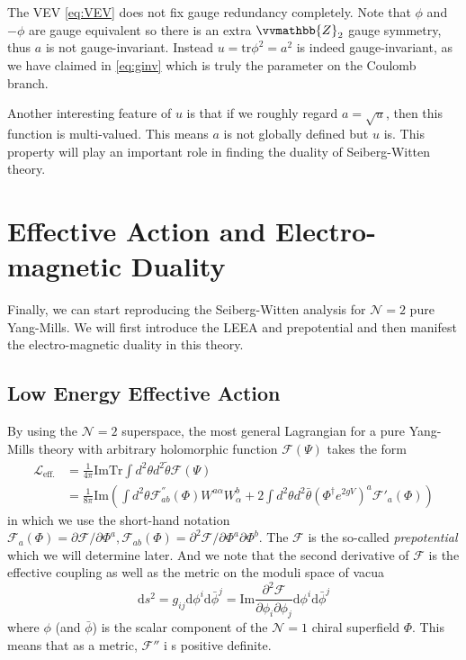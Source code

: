 \documentclass{article}
\begin{document}
The VEV \eqref{eq:VEV} does not fix gauge redundancy completely. Note that $\phi$ and $-\phi$ are gauge equivalent so there is an extra $\vvmathbb{Z}_2$ gauge symmetry, thus $a$ is not gauge-invariant. Instead $u=\mathrm{tr}\phi^2=a^2$ is indeed gauge-invariant, as we have claimed in \eqref{eq:ginv} which is truly the parameter on the Coulomb branch. 

Another interesting feature of $u$ is that if we roughly regard $a=\sqrt{u}$, then this function is multi-valued. This means $a$ is not globally defined but $u$ is. This property will play an important role in finding the duality of Seiberg-Witten theory.

\section{Effective Action and Electro-magnetic Duality}
Finally, we can start reproducing the Seiberg-Witten analysis for $\mathcal{N}=2$ pure Yang-Mills. We will first introduce the LEEA and prepotential and then manifest the electro-magnetic duality in this theory.
\subsection{Low Energy Effective Action}
By using the $\mathcal{N}=2$ superspace, the most general Lagrangian for a pure Yang-Mills theory with arbitrary holomorphic function $\mathscr{F}(\Psi)$ takes the form
\begin{equation}
\begin{aligned}
\label{eq:efflag}
\mathscr{L}_{\mathrm{eff.}} &=\frac{1}{4 \pi} \mathrm{Im} \mathrm{Tr} \int d^{2} \theta d^{2} \tilde{\theta} \mathscr{F}(\Psi) \\
&=\frac{1}{8 \pi} \mathrm{Im}\left(\int d^{2} \theta \mathscr{F}^{''}_{a b}(\Phi) W^{a \alpha} W_{\alpha}^{b}+2 \int d^{2} \theta d^{2} \bar{\theta}\left(\Phi^{\dagger} e^{2 g V}\right)^{a} \mathscr{F}'_{a}(\Phi)\right)
\end{aligned}
\end{equation}
in which we use the short-hand notation $\mathscr{F}_{a}(\Phi)=\partial \mathscr{F} / \partial \Phi^{a}, \mathscr{F}_{a b}(\Phi)=\partial^{2} \mathscr{F} / \partial \Phi^{a} \partial \Phi^{b}$. The $\mathscr{F}$ is the so-called \textit{prepotential} which we will determine later. And we note that the second derivative of $\mathscr{F}$ is the effective coupling as well as the metric on the moduli space of vacua
\begin{equation}
\label{eq:metric}
\mathrm{d} s^{2}=g_{i j} \mathrm{d} \phi^{i} \mathrm{d} \bar{\phi}^{j}=\mathrm{Im} \frac{\partial^{2} \mathscr{F}}{\partial \phi_{i} \partial \phi_{j}} \mathrm{d} \phi^{i} \mathrm{d} \bar{\phi}^{j}
\end{equation}
where $\phi$ (and $\bar{\phi}$) is the scalar component of the $\mathcal{N}=1$ chiral superfield $\Phi$. This means that as a metric, $\mathscr{F}''$ i
s positive definite.
\end{document}
